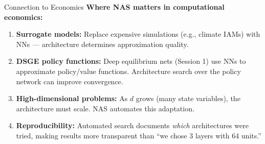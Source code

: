 \documentclass[aspectratio=169,11pt]{beamer}
\newcommand{\emphc}[1]{\textcolor{harvardcrimson}{#1}}
\begin{document}
\begin{frame}{Connection to Economics}
\textbf{Where NAS matters in computational economics:}

\vspace{0.3cm}
\begin{enumerate}
    \item \textbf{Surrogate models:} Replace expensive simulations (e.g., climate IAMs) with NNs --- architecture determines approximation quality.

    \vspace{0.2cm}
    \item \textbf{DSGE policy functions:} Deep equilibrium nets (Session 1) use NNs to approximate policy/value functions. \emphc{Architecture search over the policy network} can improve convergence.

    \vspace{0.2cm}
    \item \textbf{High-dimensional problems:} As $d$ grows (many state variables), the architecture must scale. NAS automates this adaptation.

    \vspace{0.2cm}
    \item \textbf{Reproducibility:} Automated search documents \emph{which} architectures were tried, making results more transparent than ``we chose 3 layers with 64 units.''
\end{enumerate}
\end{frame}
\end{document}
